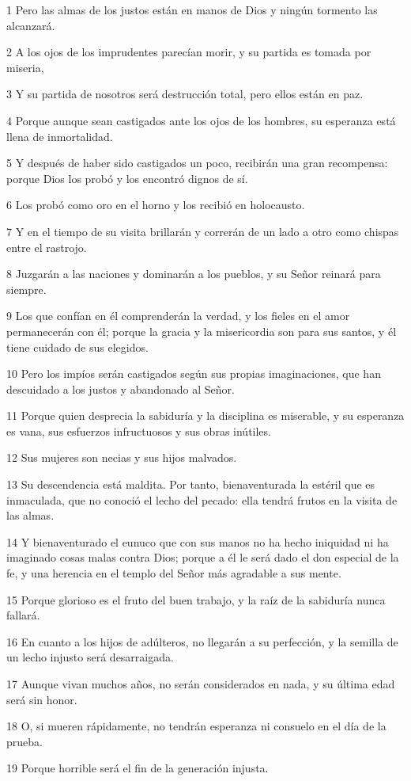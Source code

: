 \par 1 Pero las almas de los justos están en manos de Dios y ningún tormento las alcanzará.
\par 2 A los ojos de los imprudentes parecían morir, y su partida es tomada por miseria,
\par 3 Y su partida de nosotros será destrucción total, pero ellos están en paz.
\par 4 Porque aunque sean castigados ante los ojos de los hombres, su esperanza está llena de inmortalidad.
\par 5 Y después de haber sido castigados un poco, recibirán una gran recompensa: porque Dios los probó y los encontró dignos de sí.
\par 6 Los probó como oro en el horno y los recibió en holocausto.
\par 7 Y en el tiempo de su visita brillarán y correrán de un lado a otro como chispas entre el rastrojo.
\par 8 Juzgarán a las naciones y dominarán a los pueblos, y su Señor reinará para siempre.
\par 9 Los que confían en él comprenderán la verdad, y los fieles en el amor permanecerán con él; porque la gracia y la misericordia son para sus santos, y él tiene cuidado de sus elegidos.
\par 10 Pero los impíos serán castigados según sus propias imaginaciones, que han descuidado a los justos y abandonado al Señor.
\par 11 Porque quien desprecia la sabiduría y la disciplina es miserable, y su esperanza es vana, sus esfuerzos infructuosos y sus obras inútiles.
\par 12 Sus mujeres son necias y sus hijos malvados.
\par 13 Su descendencia está maldita. Por tanto, bienaventurada la estéril que es inmaculada, que no conoció el lecho del pecado: ella tendrá frutos en la visita de las almas.
\par 14 Y bienaventurado el eunuco que con sus manos no ha hecho iniquidad ni ha imaginado cosas malas contra Dios; porque a él le será dado el don especial de la fe, y una herencia en el templo del Señor más agradable a sus mente.
\par 15 Porque glorioso es el fruto del buen trabajo, y la raíz de la sabiduría nunca fallará.
\par 16 En cuanto a los hijos de adúlteros, no llegarán a su perfección, y la semilla de un lecho injusto será desarraigada.
\par 17 Aunque vivan muchos años, no serán considerados en nada, y su última edad será sin honor.
\par 18 O, si mueren rápidamente, no tendrán esperanza ni consuelo en el día de la prueba.
\par 19 Porque horrible será el fin de la generación injusta.

